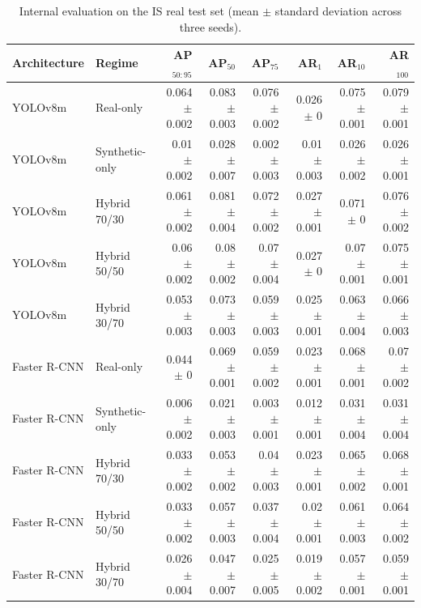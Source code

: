 \begin{table}
\caption{Internal evaluation on the IS real test set (mean $\pm$ standard deviation across three seeds).}
\label{tab:is_internal_results}
\begin{tabular}{llrrrrrr}
\toprule
Architecture & Regime & AP$_{50:95}$ & AP$_{50}$ & AP$_{75}$ & AR$_{1}$ & AR$_{10}$ & AR$_{100}$ \\
\midrule
YOLOv8m & Real-only & 0.064 $\pm$ 0.002 & 0.083 $\pm$ 0.003 & 0.076 $\pm$ 0.002 & 0.026 $\pm$ 0 & 0.075 $\pm$ 0.001 & 0.079 $\pm$ 0.001 \\
YOLOv8m & Synthetic-only & 0.01 $\pm$ 0.002 & 0.028 $\pm$ 0.007 & 0.002 $\pm$ 0.003 & 0.01 $\pm$ 0.003 & 0.026 $\pm$ 0.002 & 0.026 $\pm$ 0.001 \\
YOLOv8m & Hybrid 70/30 & 0.061 $\pm$ 0.002 & 0.081 $\pm$ 0.004 & 0.072 $\pm$ 0.002 & 0.027 $\pm$ 0.001 & 0.071 $\pm$ 0 & 0.076 $\pm$ 0.002 \\
YOLOv8m & Hybrid 50/50 & 0.06 $\pm$ 0.002 & 0.08 $\pm$ 0.002 & 0.07 $\pm$ 0.004 & 0.027 $\pm$ 0 & 0.07 $\pm$ 0.001 & 0.075 $\pm$ 0.001 \\
YOLOv8m & Hybrid 30/70 & 0.053 $\pm$ 0.003 & 0.073 $\pm$ 0.003 & 0.059 $\pm$ 0.003 & 0.025 $\pm$ 0.001 & 0.063 $\pm$ 0.004 & 0.066 $\pm$ 0.003 \\
Faster R-CNN & Real-only & 0.044 $\pm$ 0 & 0.069 $\pm$ 0.001 & 0.059 $\pm$ 0.002 & 0.023 $\pm$ 0.001 & 0.068 $\pm$ 0.001 & 0.07 $\pm$ 0.002 \\
Faster R-CNN & Synthetic-only & 0.006 $\pm$ 0.002 & 0.021 $\pm$ 0.003 & 0.003 $\pm$ 0.001 & 0.012 $\pm$ 0.001 & 0.031 $\pm$ 0.004 & 0.031 $\pm$ 0.004 \\
Faster R-CNN & Hybrid 70/30 & 0.033 $\pm$ 0.002 & 0.053 $\pm$ 0.002 & 0.04 $\pm$ 0.003 & 0.023 $\pm$ 0.001 & 0.065 $\pm$ 0.002 & 0.068 $\pm$ 0.001 \\
Faster R-CNN & Hybrid 50/50 & 0.033 $\pm$ 0.002 & 0.057 $\pm$ 0.003 & 0.037 $\pm$ 0.004 & 0.02 $\pm$ 0.001 & 0.061 $\pm$ 0.003 & 0.064 $\pm$ 0.002 \\
Faster R-CNN & Hybrid 30/70 & 0.026 $\pm$ 0.004 & 0.047 $\pm$ 0.007 & 0.025 $\pm$ 0.005 & 0.019 $\pm$ 0.002 & 0.057 $\pm$ 0.001 & 0.059 $\pm$ 0.001 \\
\bottomrule
\end{tabular}
\end{table}
